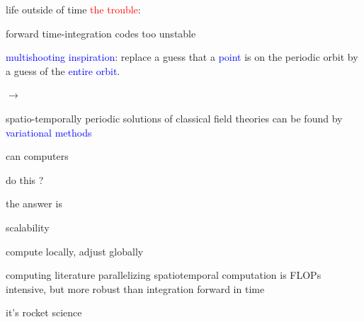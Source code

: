 \begin{frame}{life outside of time}
\textcolor{red}{the trouble}:

forward time-integration codes too unstable

\bigskip
\bigskip

\textcolor{blue}{multishooting inspiration}:
 replace a guess that a  \textcolor{blue}{point} is on the periodic
orbit by a guess of the \textcolor{blue}{entire orbit}.

\bigskip

$\to$

\bigskip

spatio-temporally periodic solutions of classical field theories
can be found by \textcolor{blue}{variational methods}
\end{frame}

\begin{frame}{can computers}

\vfill

{\Huge
do this ?
                  }

\vfill

\end{frame}


\begin{frame}{the answer is}

\vfill

{\Huge
scalability
                  }

\vfill

\end{frame}

\begin{frame}{compute locally, adjust globally}
\begin{block}{computing literature}
parallelizing {\color{red}spatiotemporal}
computation is FLOPs intensive, but more robust than
integration forward in time
\end{block}

\vfill\hfill
it's rocket science
\end{frame}

